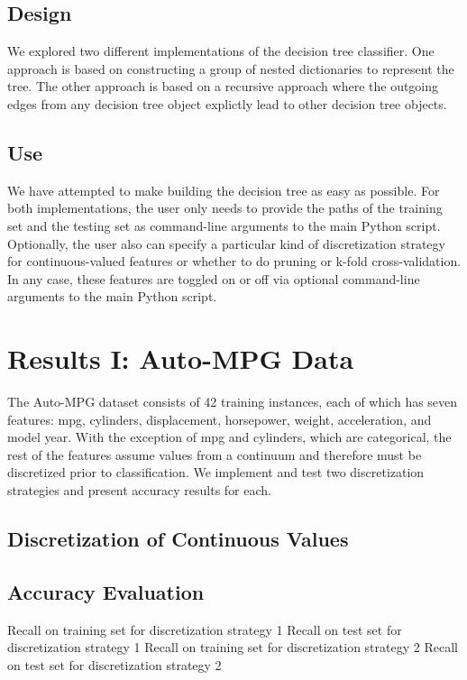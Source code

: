 \documentclass[12pt, conference, compsocconf]{IEEEtran}
\begin{document}
\subsection{Design}
We explored two different implementations of the decision tree classifier. 
One approach is based on constructing a group of nested dictionaries to represent the tree. 
The other approach is based on a recursive approach where the outgoing edges from any decision tree object explictly lead to other decision tree objects. 

\subsection{Use}
We have attempted to make building the decision tree as easy as possible.
For both implementations, the user only needs to provide the paths of the training set and the testing set as command-line arguments to the main Python script.
Optionally, the user also can specify a particular kind of discretization strategy for continuous-valued features or whether to do pruning or k-fold cross-validation. 
In any case, these features are toggled on or off via optional command-line arguments to the main Python script. 

\section{Results I: Auto-MPG Data}
The Auto-MPG dataset consists of 42 training instances, each of which has seven features: mpg, cylinders, displacement, horsepower, weight, acceleration, and model year. 
With the exception of mpg and cylinders, which are categorical, the rest of the features assume values from a continuum and therefore must be discretized prior to classification. 
We implement and test two discretization strategies and present accuracy results for each.

\subsection{Discretization of Continuous Values}

\subsection{Accuracy Evaluation}
Recall on training set for discretization strategy 1
Recall on test set for discretization strategy 1
Recall on training set for discretization strategy 2
Recall on test set for discretization strategy 2
\end{document}

